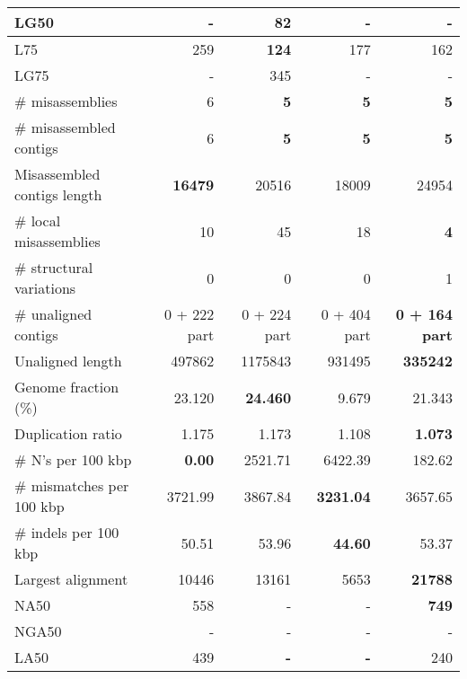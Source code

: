 \documentclass[12pt,a4paper]{article}
\begin{document}
\begin{table}[ht]
\begin{center}
\begin{tabular}{|l*{4}{|r}|}
LG50 & - & 82 & - & - \\ \hline
L75 & 259 & {\bf 124} & 177 & 162 \\ \hline
LG75 & - & 345 & - & - \\ \hline
\# misassemblies & 6 & {\bf 5} & {\bf 5} & {\bf 5} \\ \hline
\# misassembled contigs & 6 & {\bf 5} & {\bf 5} & {\bf 5} \\ \hline
Misassembled contigs length & {\bf 16479} & 20516 & 18009 & 24954 \\ \hline
\# local misassemblies & 10 & 45 & 18 & {\bf 4} \\ \hline
\# structural variations & 0 & 0 & 0 & 1 \\ \hline
\# unaligned contigs & 0 + 222 part & 0 + 224 part & 0 + 404 part & {\bf 0 + 164 part} \\ \hline
Unaligned length & 497862 & 1175843 & 931495 & {\bf 335242} \\ \hline
Genome fraction (\%) & 23.120 & {\bf 24.460} & 9.679 & 21.343 \\ \hline
Duplication ratio & 1.175 & 1.173 & 1.108 & {\bf 1.073} \\ \hline
\# N's per 100 kbp & {\bf 0.00} & 2521.71 & 6422.39 & 182.62 \\ \hline
\# mismatches per 100 kbp & 3721.99 & 3867.84 & {\bf 3231.04} & 3657.65 \\ \hline
\# indels per 100 kbp & 50.51 & 53.96 & {\bf 44.60} & 53.37 \\ \hline
Largest alignment & 10446 & 13161 & 5653 & {\bf 21788} \\ \hline
NA50 & 558 & - & - & {\bf 749} \\ \hline
NGA50 & - & - & - & - \\ \hline
LA50 & 439 & {\bf -} & {\bf -} & 240 \\ \hline
\end{tabular}
\end{center}
\end{table}
\end{document}
